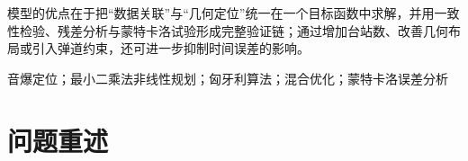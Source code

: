 \documentclass[12pt,a4paper]{article}
\newcommand{\tip}[1]{\par\noindent\textbf{【提示】} #1\par}
\newcommand{\warning}[1]{\par\noindent\textbf{【高频失分点】} #1\par}
\begin{document}
模型的优点在于把“数据关联”与“几何定位”统一在一个目标函数中求解，并用一致性检验、残差分析与蒙特卡洛试验形成完整验证链；通过增加台站数、改善几何布局或引入弹道约束，还可进一步抑制时间误差的影响。

\vspace{2ex}
 音爆定位；最小二乘法非线性规划；匈牙利算法；混合优化；蒙特卡洛误差分析





\clearpage

\section{问题重述}

\end{document}
